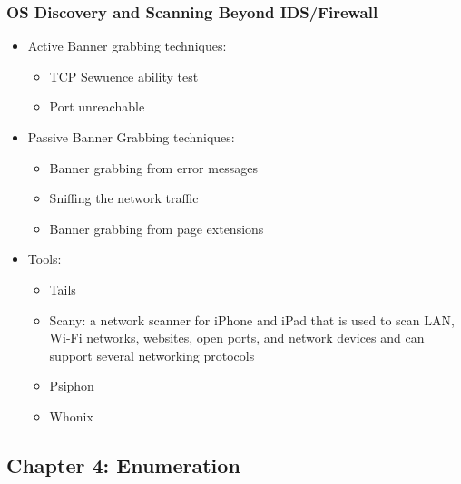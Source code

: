 \subsubsection{OS Discovery and Scanning Beyond IDS/Firewall}
\begin{itemize}
    \item Active Banner grabbing techniques:
    \begin{itemize}
        \item TCP Sewuence ability test
        \item Port unreachable 
    \end{itemize}
    \item Passive Banner Grabbing techniques:
    \begin{itemize}
        \item Banner grabbing from error messages
        \item Sniffing the network traffic
        \item Banner grabbing from page extensions
    \end{itemize}
    \item Tools:
    \begin{itemize}
        \item Tails
        \item Scany: a network scanner for iPhone and iPad that is used to scan LAN, Wi-Fi networks, websites, open ports, and network devices and can support several networking protocols
        \item Psiphon
        \item Whonix
    \end{itemize}
\end{itemize}

\subsection{Chapter 4: Enumeration}
